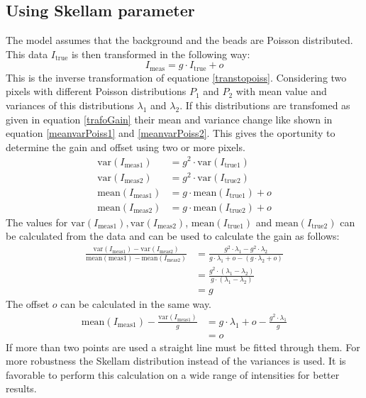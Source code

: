 \subsection{Using Skellam parameter} \label{skellam1}
The model assumes that the background and the beads are Poisson distributed. This data $I_\text{true}$ is then transformed in the following way:
\begin{equation}
	I_\text{meas} = g \cdot I_\text{true} + o \label{trafoGain}
\end{equation}
This is the inverse transformation of equatione \ref{transtopoiss}.\newline
Considering two pixels with different Poisson distributions $P_1$ and $P_2$ with mean value and variances of this distributions $\lambda_1$ and $\lambda_2$. If this distributions are transfomed as given in equation \ref{trafoGain} their mean and variance change like shown in equation \ref{meanvarPoiss1} and \ref{meanvarPoiss2}. This gives the oportunity to determine the gain and offset using two or more pixels.
\begin{align}
	\text{var}(I_{\text{meas}1})& = g^2\cdot\text{var}(I_{\text{true}1})\\ 
	\text{var}(I_{\text{meas}2})& = g^2\cdot\text{var}(I_{\text{true}2})\\
	\text{mean}(I_{\text{meas}1})& = g\cdot \text{mean}(I_{\text{true}1}) + o\\
	\text{mean}(I_{\text{meas}2})& = g\cdot \text{mean}(I_{\text{true}2}) + o
\end{align}
The values for $\text{var}(I_{\text{meas}1}), \text{var}(I_{\text{meas}2})$, $\text{mean}(I_{\text{true}1})$ and $\text{mean}(I_{\text{true}2})$ can be calculated from the data and can be used to calculate the gain as follows:
\begin{align}
	\frac{\text{var}(I_{\text{meas}1})-\text{var}(I_{\text{meas}2})}{\text{mean}({\text{meas}1})-\text{mean}(I_{\text{meas}2})}&= \frac{g^2\cdot \lambda_1  - g^2\cdot \lambda_2 }{g\cdot \lambda_1 + o - (g\cdot \lambda_2+o)}\\
	& = \frac{g^2\cdot(\lambda_1-\lambda_2)}{g\cdot (\lambda_1-\lambda_2)}\\
	& = g
\end{align}
The offset $o$ can be calculated in the same way.
\begin{align}
	\text{mean}(I_{\text{meas}1}) - \frac{\text{var}(I_{\text{meas}1})}{g} &= g\cdot \lambda_1 + o - \frac{g^2\cdot\lambda_1}{g}\\
	&= o
\end{align}
If more than two points are used a straight line must be fitted through them. For more robustness the Skellam distribution instead of the variances is used. It is favorable to perform this calculation on a wide range of intensities for better results.
